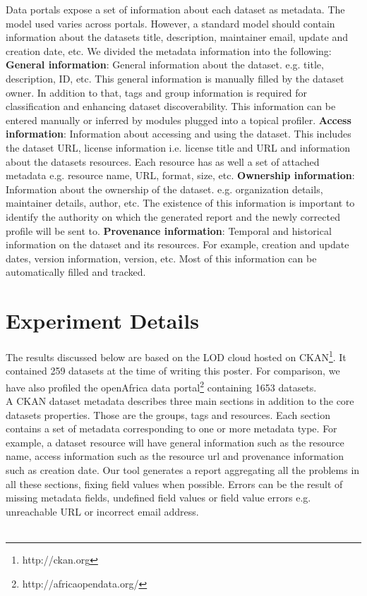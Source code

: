 \documentclass{sig-alternate}
\begin{document}
Data portals expose a set of information about each dataset as metadata. The model used varies across portals. However, a standard model should contain information about the datasets title, description, maintainer email, update and creation date, etc. We divided the metadata information into the following:
\textbf{General information}: General information about the dataset. e.g. title, description, ID, etc. This general information is manually filled by the dataset owner. In addition to that, tags and group information is required for classification and enhancing dataset discoverability. This information can be entered manually or inferred by modules plugged into a topical profiler.
\textbf{Access information}: Information about accessing and using the dataset. This includes the dataset URL, license information i.e. license title and URL and information about the datasets resources. Each resource has as well a set of attached metadata e.g. resource name, URL, format, size, etc.
\textbf{Ownership information}: Information about the ownership of the dataset. e.g. organization details, maintainer details, author, etc. The existence of this information is important to identify the authority on which the generated report and the newly corrected profile will be sent to.
\textbf{Provenance information}: Temporal and historical information on the dataset and its resources. For example, creation and update dates, version information, version, etc. Most of this information can be automatically filled and tracked.

\section{Experiment Details}
The results discussed below are based on the LOD cloud hosted on CKAN\footnote{http://ckan.org}. It contained 259 datasets at the time of writing this poster. For comparison, we have also profiled the openAfrica data portal\footnote{http://africaopendata.org/} containing 1653 datasets.\\
A CKAN dataset metadata describes three main sections in addition to the core datasets properties. Those are the groups, tags and resources. Each section contains a set of metadata corresponding to one or more metadata type. For example, a dataset resource will have general information such as the resource name, access information such as the resource url and provenance information such as creation date. Our tool generates a report aggregating all the problems in all these sections, fixing field values when possible. Errors can be the result of missing metadata fields, undefined field values or field value errors e.g. unreachable URL or incorrect email address.\\\\
\end{document}
